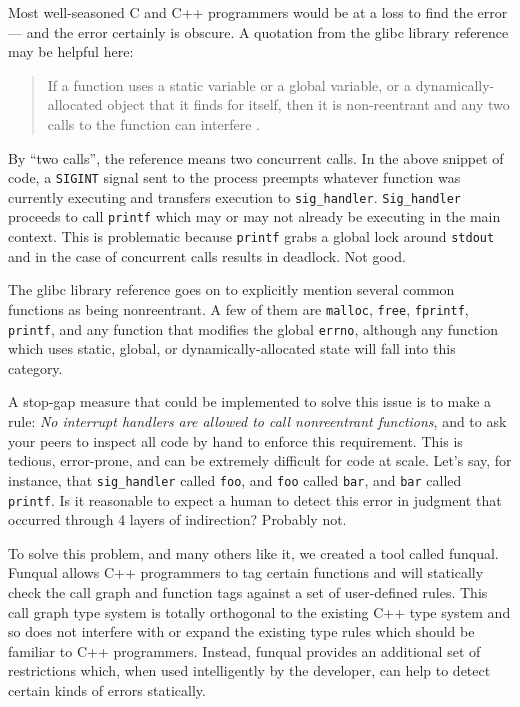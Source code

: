 \newpage
Most well-seasoned C and C++ programmers would be at a loss to find the error --- and the error certainly is obscure.  A quotation from the glibc library reference may be helpful here:

\begin{quote}
    If a function uses a static variable or a global variable, or a dynamically-allocated object that it finds for itself, then it is non-reentrant and any two calls to the function can interfere \cite{gnu-manual}.
\end{quote}

By ``two calls'', the reference means two concurrent calls.  In the above snippet of code, a \lstinline{SIGINT} signal sent to the process preempts whatever function was currently executing and transfers execution to \lstinline{sig_handler}.  \lstinline{Sig_handler} proceeds to call \lstinline{printf} which may or may not already be executing in the main context.  This is problematic because \lstinline{printf} grabs a global lock around \lstinline{stdout} and in the case of concurrent calls results in deadlock.  Not good.

The glibc library reference goes on to explicitly mention several common functions as being nonreentrant.  A few of them are \lstinline{malloc}, \lstinline{free}, \lstinline{fprintf}, \lstinline{printf}, and any function that modifies the global \lstinline{errno}, although any function which uses static, global, or dynamically-allocated state will fall into this category.  

A stop-gap measure that could be implemented to solve this issue is to make a rule: \textit{No interrupt handlers are allowed to call nonreentrant functions}, and to ask your peers to inspect all code by hand to enforce this requirement.  This is tedious, error-prone, and can be extremely difficult for code at scale.  Let's say, for instance, that \lstinline{sig_handler} called \lstinline{foo}, and \lstinline{foo} called \lstinline{bar}, and \lstinline{bar} called \lstinline{printf}.  Is it reasonable to expect a human to detect this error in judgment that occurred through 4 layers of indirection?  Probably not.

To solve this problem, and many others like it, we created a tool called funqual.  Funqual allows C++ programmers to tag certain functions and will statically check the call graph and function tags against a set of user-defined rules.  This call graph type system is totally orthogonal to the existing C++ type system and so does not interfere with or expand the existing type rules which should be familiar to C++ programmers.  Instead, funqual provides an additional set of restrictions which, when used intelligently by the developer, can help to detect certain kinds of errors statically.

